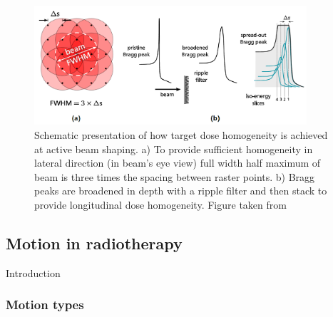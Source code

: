 \documentclass[type=dr, dr=rernat, accentcolor=tud7b,colorbacktitle, bigchapter, openright, twoside, 12pt ]{tudthesis}
\begin{document}
\begin{figure}[H]
\begin{center}
\includegraphics[width=0.9\textwidth]{./Images/active.png}
\caption{Schematic presentation of how target dose homogeneity is achieved at active beam shaping. a) To provide sufficient homogeneity in lateral direction (in beam's eye view) full width
half maximum of beam is three times the spacing between raster points. b) Bragg peaks are broadened in depth with a ripple filter and then stack to provide longitudinal dose homogeneity. 
Figure taken from \cite{Richter2012}}
\label{active}
\end{center}
\end{figure}


\newpage

\subsection{Motion in radiotherapy}
\label{sec:motion}

Introduction


\subsubsection{Motion types}
\end{document}
